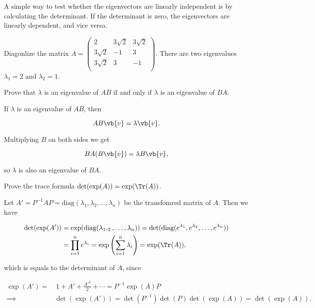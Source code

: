 \documentclass[a4paper,12pt]{report}
\begin{document}
A simple way to test whether the eigenvectors are linearly independent is by calculating the determinant. If the determinant is zero, the eigenvectors are linearly dependent, and vice versa.

{Diagonlize the matrix \(A = \begin{pmatrix}
    2 & 3\sqrt{2}  & 3\sqrt{2}   \\
    3\sqrt{2}  & -1 & 3  \\
    3\sqrt{2}  & 3 & -1  \\
\end{pmatrix}\). }
{There are two eigenvalues \(\lambda _{1} = 2 \text { and } \lambda _{2} =1 \).  } 

{Prove that \(\lambda \) is an eigenvalue of \(AB\) if and only if \(\lambda \) is an eigenvalue of \(BA\).}
{If \(\lambda \) is an eigenvalue of \(AB\), then 

\begin{equation}
    AB\vb{v} = \lambda \vb{v} .
\end{equation}

Multiplying \(B\) on both sides we get 

\begin{equation}
    BA(B\vb{v} ) = \lambda B\vb{v},
\end{equation}

so \(\lambda \) is also an eigenvalue of \(BA\). 

} 

{Prove the trace formula \(\det (\exp (A)) = \exp (\Tr (A)) \).}
{Let \(A' = P^{-1} AP = \text{diag} (\lambda _{1}, \lambda _{2}, \ldots , \lambda _{n}   )\) be the transfomred matrix of \(A\). Then we have

\begin{equation}
    \begin{aligned} 
    \det (\exp (A')) &= \exp (\text{diag} (\lambda _{1}, _{2}, \ldots ,\lambda _{n}   )) = \det (\text{diag} (e^{\lambda _{1} }, e^{\lambda _{2} },\ldots , e^{\lambda _{n} }   )) \\ &= \prod_{i=1}^{n} e^{\lambda _{i} } = \exp \left( \sum_{i=1}^{n} \lambda _{i}  \right) = \exp (\Tr (A)),
    \end{aligned} 
\end{equation}

which is equals to the determinant of \(A\), since


\begin{equation}
    \begin{aligned} 
    \exp (A') = &~1+A'+\frac{A'^2}{2} + \cdots = P^{-1} \exp (A) P \\
    \implies &\det (\exp (A')) = \det (P^{-1} ) \det (P) \det (\exp (A)) = \det (\exp (A)).
    \end{aligned} 
\end{equation}~
} 
\end{document}
